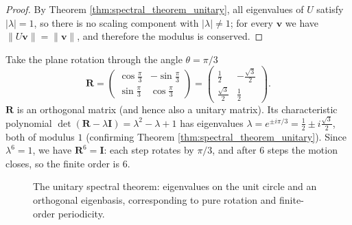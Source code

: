 \begin{proof}
By Theorem \ref{thm:spectral_theorem_unitary}, all eigenvalues of $U$ satisfy $|\lambda| = 1$, so there is no scaling component with $|\lambda| \neq 1$; for every $\mathbf{v}$ we have $\|U\mathbf{v}\| = \|\mathbf{v}\|$, and therefore the modulus is conserved.
\end{proof}

\begin{example}\label{ch5_example_rotation_2x2}
Take the plane rotation through the angle $\theta = \pi/3$
\[
\mathbf{R} = \begin{pmatrix} \cos\frac{\pi}{3} & -\sin\frac{\pi}{3} \\ \sin\frac{\pi}{3} & \cos\frac{\pi}{3} \end{pmatrix}
= \begin{pmatrix} \tfrac12 & -\tfrac{\sqrt3}{2} \\ \tfrac{\sqrt3}{2} & \tfrac12 \end{pmatrix}.
\]
$\mathbf{R}$ is an orthogonal matrix (and hence also a unitary matrix). Its characteristic polynomial $\det(\mathbf{R}-\lambda\mathbf{I}) = \lambda^2 - \lambda + 1$ has eigenvalues $\lambda = e^{\pm i\pi/3} = \tfrac12 \pm i\tfrac{\sqrt3}{2}$, both of modulus $1$ (confirming Theorem \ref{thm:spectral_theorem_unitary}). Since $\lambda^6 = 1$, we have $\mathbf{R}^6 = \mathbf{I}$: each step rotates by $\pi/3$, and after $6$ steps the motion closes, so the finite order is $6$.
\end{example}

\begin{figure}[htbp]
\centering
{}
\caption{The unitary spectral theorem: eigenvalues on the unit circle and an orthogonal eigenbasis, corresponding to pure rotation and finite-order periodicity.}
\label{fig:unitary_spectral}
\end{figure}


